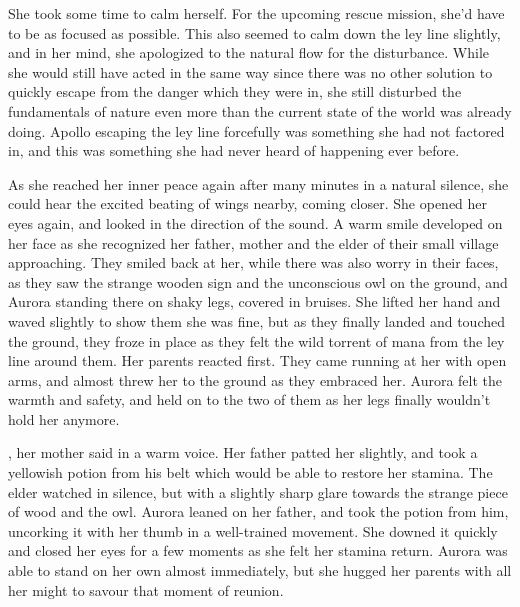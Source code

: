 She took some time to calm herself. For the upcoming rescue mission, she'd have to be as focused as possible. This also seemed to calm down the ley line slightly, and in her mind, she apologized to the natural flow for the disturbance. While she would still have acted in the same way since there was no other solution to quickly escape from the danger which they were in, she still disturbed the fundamentals of nature even more than the current state of the world was already doing. Apollo escaping the ley line forcefully was something she had not factored in, and this was something she had never heard of happening ever before.

As she reached her inner peace again after many minutes in a natural silence, she could hear the excited beating of wings nearby, coming closer. She opened her eyes again, and looked in the direction of the sound. A warm smile developed on her face as she recognized her father, mother and the elder of their small village approaching. They smiled back at her, while there was also worry in their faces, as they saw the strange wooden sign and the unconscious owl on the ground, and Aurora standing there on shaky legs, covered in bruises. She lifted her hand and waved slightly to show them she was fine, but as they finally landed and touched the ground, they froze in place as they felt the wild torrent of mana from the ley line around them. Her parents reacted first. They came running at her with open arms, and almost threw her to the ground as they embraced her. Aurora felt the warmth and safety, and held on to the two of them as her legs finally wouldn't hold her anymore. 

, her mother said in a warm voice. Her father patted her slightly, and took a yellowish potion from his belt which would be able to restore her stamina. The elder watched in silence, but with a slightly sharp glare towards the strange piece of wood and the owl. Aurora leaned on her father, and took the potion from him, uncorking it with her thumb in a well-trained movement. She downed it quickly and closed her eyes for a few moments as she felt her stamina return. Aurora was able to stand on her own almost immediately, but she hugged her parents with all her might to savour that moment of reunion.

